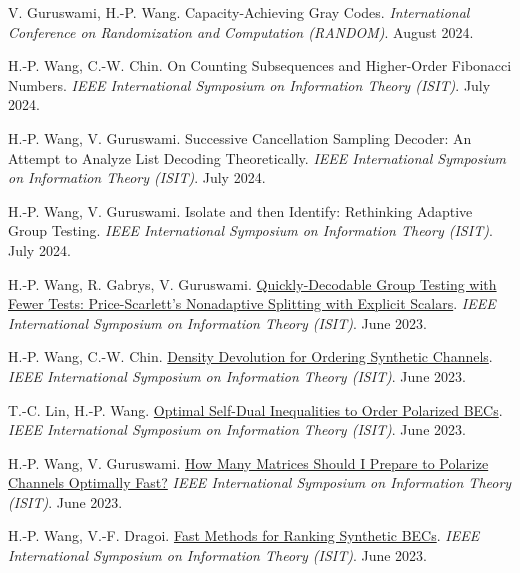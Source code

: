 \documentclass{article}
\def\sec#1{\vskip1em\textbf{\fs1#1}}
\def\fs#1{%
        \pgfmathsetmacro\a{#1}%
        \pgfmathsetmacro\A{\parskip*(4/3)^\a}%
        \pgfmathsetmacro\B{\A*(4/3)}%
        \fontsize{\A pt}{\B pt}\selectfont%
    }
\begin{document}
\bgroup
\def\section#1#2{\sec{Peer-Reviewed Conference Publications \mdseries (new to old)}}
\begin{thebibliography}{C99}
    V. Guruswami, H.-P. Wang.
    {Capacity-Achieving Gray Codes}.
    \emph{International Conference on Randomization and Computation (RANDOM)}.
    August 2024.

    H.-P. Wang, C.-W. Chin.
    {On Counting Subsequences and Higher-Order Fibonacci Numbers}.
    \emph{IEEE International Symposium on Information Theory (ISIT)}.
    July 2024.
 
    H.-P. Wang, V. Guruswami.
    {Successive Cancellation Sampling Decoder: An Attempt to Analyze List Decoding Theoretically}.
    \emph{IEEE International Symposium on Information Theory (ISIT)}.
    July 2024.
 
     H.-P. Wang, V. Guruswami.
    {Isolate and then Identify: Rethinking Adaptive Group Testing}.
    \emph{IEEE International Symposium on Information Theory (ISIT)}.
    July 2024.

    H.-P. Wang, R. Gabrys, V. Guruswami.
    \href{https://doi.org/10.1109/ISIT54713.2023.10206843}
    {Quickly-Decodable Group Testing with Fewer Tests: Price-Scarlett's Nonadaptive Splitting with Explicit Scalars}.
    \emph{IEEE International Symposium on Information Theory (ISIT)}.
    June 2023.

    H.-P. Wang, C.-W. Chin.
    \href{https://doi.org/10.1109/ISIT54713.2023.10206540}
    {Density Devolution for Ordering Synthetic Channels}.
    \emph{IEEE International Symposium on Information Theory (ISIT)}.
    June 2023.

    T.-C. Lin, H.-P. Wang.
    \href{https://doi.org/10.1109/ISIT54713.2023.10206451}
    {Optimal Self-Dual Inequalities to Order Polarized BECs}.
    \emph{IEEE International Symposium on Information Theory (ISIT)}.
    June 2023.

    H.-P. Wang, V. Guruswami.
    \href{https://doi.org/10.1109/ISIT54713.2023.10206989}
    {How Many Matrices Should I Prepare to Polarize Channels Optimally Fast?}
    \emph{IEEE International Symposium on Information Theory (ISIT)}.
    June 2023.

    H.-P. Wang, V.-F. Dragoi.
    \href{https://doi.org/10.1109/ISIT54713.2023.10206704}
    {Fast Methods for Ranking Synthetic BECs}.
    \emph{IEEE International Symposium on Information Theory (ISIT)}.
    June 2023.


\end{thebibliography}
\end{document}

